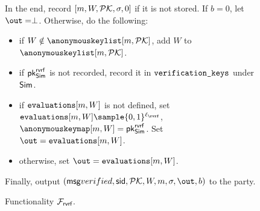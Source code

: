 \begin{figure}
\begin{tcolorbox}
{\begin{description}
\begin{enumerate}[label={{Cond.-} }{{\arabic*}}, start = 1]
				
			\end{enumerate}
			In the end,  record $ [m,W,{\mathcal{PK}},\sigma, 0] $ if it is not stored. If $ b = 0 $, let $ \out = \perp $. Otherwise,   do the following:
			\begin{itemize}
				\item if $ W \notin \anonymouskeylist[m,\pkring] $, add $ W $ to $ \anonymouskeylist[m,\pkring]  $.
				\item if $ \mathsf{pk}^{\mathsf{rvrf}}_{\mathsf{Sim}} $ is not recorded, record it in $ \texttt{verification\_keys} $ under $ \mathsf{Sim} $.
				\item if $ \texttt{evaluations}[m,W] $ is not defined, set $ \evaluationslist[m, W]\sample \bin^{\ell_\rvrf}$, $ \anonymouskeymap[m,W]  = \pkrvrf_\simulator$.  Set $ \out = \evaluationslist[m, W]$.
				\item otherwise, set $ \out = \evaluationslist[m, W]$. 	
			\end{itemize}
			Finally, output $(\msg{verified}, \sid, \pkring,W, m, \sigma, \out, b)$ to the party.
			
		\end{description}
		
		
	}
\end{tcolorbox}
\caption{Functionality $\mathcal{F}_{\textsf{rvrf}}$.\label{f:gvrf}}
\end{figure}




